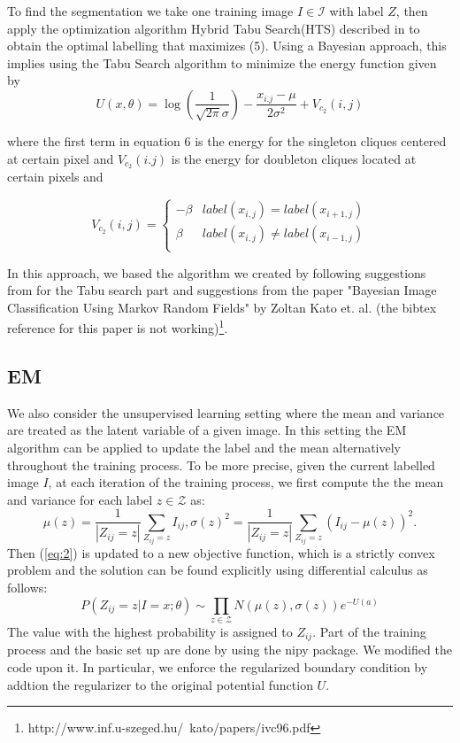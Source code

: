 \documentclass[twoside,10.5pt]{article}
\begin{document}
To find the segmentation we take one training image $I \in \mathcal{I}$ with label $Z$, then apply the optimization algorithm Hybrid Tabu Search(HTS) described in  \citet{Patra:2007:ISU:1335117.1335489} to obtain the optimal labelling that maximizes (5). Using a Bayesian approach, this implies using the Tabu Search algorithm to minimize the energy function given by 
\begin{equation}
    U(x,\theta) = \log(\frac{1}{\sqrt{2\pi} \sigma}) - \frac{x_{i.j} - \mu}{2\sigma^2} + V_{c_2}(i,j)
\end{equation} 

where the first term in equation 6 is the energy for the singleton cliques centered at certain pixel and $V_{c_2}(i.j)$ is the energy for doubleton cliques located at certain pixels and 

\[ V_{c_2}(i,j) = \left\{
\begin{array}{ll}
      -\beta & label(x_{i,j}) = label(x_{i+1,j}) \\
      \beta & label(x_{i,j}) \neq label(x_{i-1,j}) \\
\end{array} 
\right. \]

In this approach, we based the algorithm we created by following suggestions from \citet{Patra:2007:ISU:1335117.1335489} for the Tabu search part and suggestions from the paper "Bayesian Image Classification Using Markov Random Fields" by Zoltan Kato et. al. (the bibtex reference for this paper is not working)\footnote{http://www.inf.u-szeged.hu/~kato/papers/ivc96.pdf}. 

\subsection{EM}
We also consider the unsupervised learning setting where the mean and variance are treated as the latent variable of a given image. In this setting the EM algorithm can be applied to update the label and the mean alternatively throughout the training process. To be more precise, given the current labelled image $I$, at each iteration of the training process, we first compute the the mean and variance for each label $z \in \mathcal{Z}$ as:
\begin{equation}
\mu(z) = \frac{1}{|Z_{ij}=z|} \sum_{Z_{ij}=z} I_{ij}, \sigma(z)^2 = \frac{1}{|Z_{ij}=z|} \sum_{Z_{ij}=z}  (I_{ij}-\mu(z))^2.
\end{equation}
Then (\ref{eq:2}) is updated to a new objective function, which is a strictly convex problem and the solution can be found explicitly using differential calculus as follows:
\begin{equation}
P(Z_{ij}=z|I = x; \theta) \sim \prod_{z \in \mathcal{Z}}N(\mu(z), \sigma(z)) e^{-U(a)}
\end{equation}
The value with the highest probability is assigned to $Z_{ij}$. Part of the training process and the basic set up are done by using the nipy package. We modified the code upon it. In particular, we enforce the regularized boundary condition by addtion the regularizer to the original potential function $U$.
\end{document}
